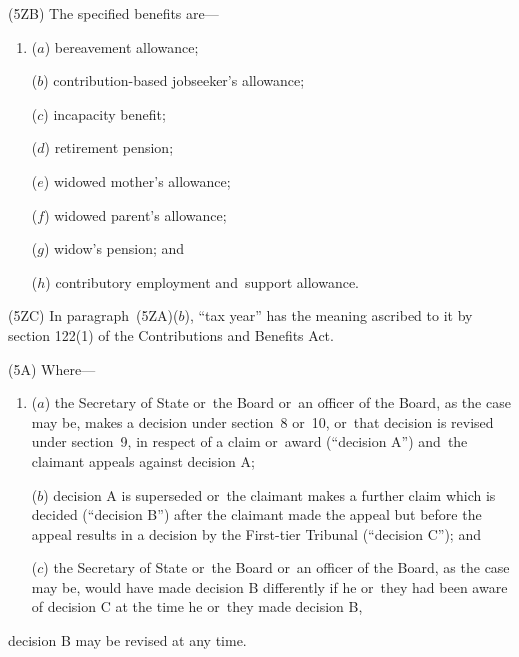 \documentclass[12pt,a4paper]{article}
\begin{document}
(5ZB) The specified benefits are—
\begin{enumerate}\item[]
($a$) bereavement allowance;

($b$) contribution-based jobseeker’s allowance;

($c$) incapacity benefit;

($d$) retirement pension;

($e$) widowed mother’s allowance;

($f$) widowed parent’s allowance; 

($g$) widow’s pension;
% 
and

($h$) contributory employment and~support allowance.
\end{enumerate}

(5ZC) In paragraph~(5ZA)($b$), “tax year” has the meaning ascribed to it by section 122(1) of the Contributions and Benefits Act.

(5A) Where—
\begin{enumerate}\item[]
($a$) the Secretary of State or~the Board or~an officer of the Board, as the case may be, makes a decision under section~8 or~10, or~that decision is revised under section~9, in respect of a claim or~award (“decision A”) and~the claimant appeals against decision A;

($b$) decision A is superseded or~the claimant makes a further claim which is decided (“decision B”) after the claimant made the appeal but before the appeal results in a decision by 
the First-tier Tribunal  %
(“decision C”); and

($c$) the Secretary of State or~the Board or~an officer of the Board, as the case may be, would have made decision B differently if he or~they had been aware of decision C at the time he or~they made decision B,
\end{enumerate}
decision B may be revised at any time.
\end{document}

